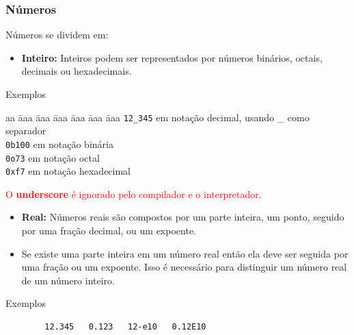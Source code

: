 \begin{frame}[fragile, allowframebreaks=0.9]

	\frametitle{Números}
	
	Números se dividem em:
	
	\begin{itemize}
		
		\item \textbf{Inteiro:} Inteiros podem ser representados por números binários, octais,
		decimais ou hexadecimais.
		
	\end{itemize}
	
	\begin{block}{Exemplos}
		\begin{tabbing}
			aa \= aaa \= aaa \= aaa \= aaa \= aaa \= aaa \kill
			\> \texttt{12\_345} \> \>  em notação decimal, usando \_ como separador \\
			\> \texttt{0b100} \> \>  em notação binária  \\
			\> \texttt{0o73} \> \>  em notação octal \\
			\> \texttt{0xf7} \> \>  em notação hexadecimal  
		\end{tabbing}
	\end{block}

\textcolor{red}{O \textbf{underscore} é ignorado pelo compilador e o interpretador.}

\framebreak
	
	\begin{itemize}
		
		\item \textbf{Real:} Números reais são compostos por um parte inteira, um ponto,
		 seguido por uma fração decimal, ou um expoente.
		
		\item Se existe uma parte inteira em um número real então ela deve ser seguida por uma
		fração ou um expoente. Isso é necessário para distinguir um número real de um número inteiro.
	\end{itemize}
	
	\begin{block}{Exemplos}
		\begin{verbatim}
		12.345   0.123   12-e10   0.12E10
		\end{verbatim}
	\end{block}
	
\end{frame}

